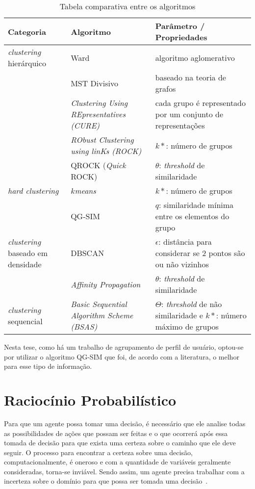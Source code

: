 \begin{table}[h!]
	\caption{Tabela comparativa entre os algoritmos}
	\label{tab:comp_algo_agrupamento}
	\begin{tabular}{ m{2.8cm} | m{5cm} | m{7cm} } \hline
	Categoria & Algoritmo & Parâmetro / Propriedades \\ \hline
	\emph{clustering} hierárquico & Ward & algoritmo aglomerativo \\ \hline
	& MST Divisivo & baseado na teoria de grafos \\ \hline
	& \emph{Clustering Using REpresentatives (CURE)} & cada grupo é representado por um conjunto de representações \\ \hline
	& \emph{RObust Clustering using linKs (ROCK)} & $k*$: número de grupos \\ \hline
	& QROCK (\emph{Quick} ROCK) & $\theta$: \emph{threshold} de similaridade  \\ \hline
	\emph{hard clustering} & $k$\emph{means} & $k*$: número de grupos \\ \hline
    & QG-SIM & $q$: similaridade mínima entre os elementos do grupo \\ \hline
	\emph{clustering} baseado em densidade & DBSCAN & $\epsilon$: distância para considerar se 2 pontos são ou não vizinhos \\ \hline
	& \emph{Affinity Propagation} & $\theta$: \emph{threshold} de similaridade  \\ \hline
	\emph{clustering} sequencial & \emph{Basic Sequential Algorithm Scheme (BSAS)} & $\Theta$: \emph{threshold} de não similaridade e $k*$: número máximo de grupos  \\ \hline
	\end{tabular}
\end{table}

Nesta tese, como há um trabalho de agrupamento de perfil de usuário, optou-se por utilizar o algoritmo QG-SIM que foi, de acordo com a literatura, o melhor para esse tipo de informação.

\section{Raciocínio Probabilístico}
\label{sec:raciocinio-probabilistico}
Para que um agente possa tomar uma decisão, é necessário que ele analise todas as possibilidades de ações que possam ser feitas e o que ocorrerá após essa tomada de decisão para que exista uma certeza sobre o caminho que ele deve seguir. O processo para encontrar a certeza sobre uma decisão, computacionalmente, é oneroso e com a quantidade de variáveis geralmente consideradas, torna-se inviável. Sendo assim, um agente precisa trabalhar com a incerteza sobre o domínio para que possa ser tomada uma decisão~\cite{russell:2002}.

